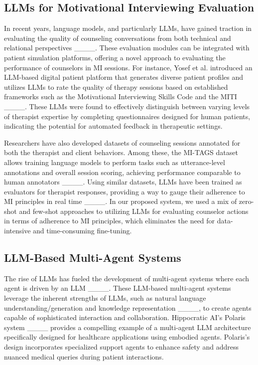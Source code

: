 \subsection{LLMs for Motivational Interviewing Evaluation}
In recent years, language models, and particularly LLMs, have gained traction in evaluating the quality of counseling conversations from both technical and relational perspectives ____. These evaluation modules can be integrated with patient simulation platforms, offering a novel approach to evaluating the performance of counselors in MI sessions. For instance, Yosef et al. introduced an LLM-based digital patient platform that generates diverse patient profiles and utilizes LLMs to rate the quality of therapy sessions based on established frameworks such as the Motivational Interviewing Skills Code and the MITI ____. These LLMs were found to effectively distinguish between varying levels of therapist expertise by completing questionnaires designed for human patients, indicating the potential for automated feedback in therapeutic settings.

Researchers have also developed datasets of counseling sessions annotated for both the therapist and client behaviors. Among these, the MI-TAGS dataset allows training language models to perform tasks such as utterance-level annotations and overall session scoring, achieving performance comparable to human annotators ____. Using similar datasets, LLMs have been trained as evaluators for therapist responses, providing a way to gauge their adherence to MI principles in real time ____. In our proposed system, we used a mix of zero-shot and few-shot approaches to utilizing LLMs for evaluating counselor actions in terms of adherence to MI principles, which eliminates the need for data-intensive and time-consuming fine-tuning.

\subsection{LLM-Based Multi-Agent Systems}
The rise of LLMs has fueled the development of multi-agent systems where each agent is driven by an LLM ____. These LLM-based multi-agent systems leverage the inherent strengths of LLMs, such as natural language understanding/generation and knowledge representation ____, to create agents capable of sophisticated interaction and collaboration. Hippocratic AI's Polaris system ____ provides a compelling example of a multi-agent LLM architecture specifically designed for healthcare applications using embodied agents. Polaris's design incorporates specialized support agents to enhance safety and address nuanced medical queries during patient interactions. 

